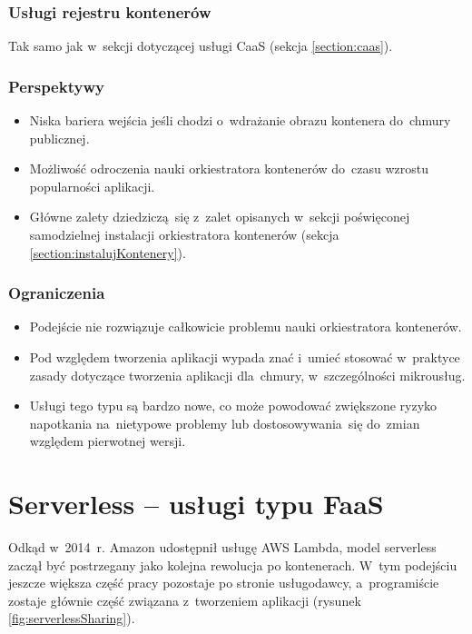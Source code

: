 \documentclass[12pt,a4paper,twoside,titlepage,openright]{book}
\begin{document}
\subsubsection{Usługi rejestru kontenerów}
Tak samo jak w~sekcji dotyczącej usługi CaaS (sekcja \ref{section:caas}).

\subsubsection{Perspektywy}
\begin{itemize}
\item Niska bariera wejścia jeśli chodzi o~wdrażanie obrazu kontenera do~chmury publicznej.
\item Możliwość odroczenia nauki orkiestratora kontenerów do~czasu wzrostu popularności aplikacji.
\item Główne zalety dziedziczą~się z~zalet opisanych w~sekcji poświęconej samodzielnej instalacji orkiestratora kontenerów (sekcja \ref{section:instalujKontenery}).
\end{itemize}

\subsubsection{Ograniczenia}
\begin{itemize}
\item Podejście nie rozwiązuje całkowicie problemu nauki orkiestratora kontenerów.
\item Pod względem tworzenia aplikacji wypada znać i~umieć stosować w~praktyce zasady dotyczące tworzenia aplikacji dla~chmury, w~szczególności mikrousług.
\item Usługi tego typu są bardzo nowe, co może powodować zwiększone ryzyko napotkania na~nietypowe problemy lub dostosowywania~się do~zmian względem pierwotnej wersji.
\end{itemize}

\section{Serverless -- usługi typu FaaS} \label{section:podejscieServerless}

Odkąd w~2014~r. Amazon udostępnił usługę AWS Lambda, model serverless zaczął być postrzegany jako kolejna rewolucja po kontenerach. W~tym podejściu jeszcze większa część pracy pozostaje po stronie usługodawcy, a~programiście zostaje głównie część związana z~tworzeniem aplikacji (rysunek \ref{fig:serverlessSharing}).
\end{document}
